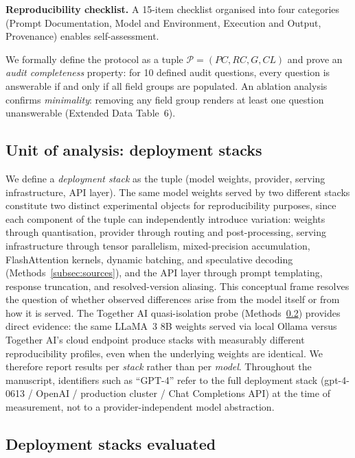 \documentclass[sn-nature]{sn-jnl}
\begin{document}
\textbf{Reproducibility checklist.}
A 15-item checklist organised into four categories (Prompt Documentation, Model and Environment, Execution and Output, Provenance) enables self-assessment.

We formally define the protocol as a tuple $\mathcal{P} = (\mathit{PC}, \mathit{RC}, G, \mathit{CL})$ and prove an \emph{audit completeness} property: for 10 defined audit questions, every question is answerable if and only if all field groups are populated.
An ablation analysis confirms \emph{minimality}: removing any field group renders at least one question unanswerable (Extended Data Table~6).


\subsection{Unit of analysis: deployment stacks}\label{subsec:stacks}

We define a \emph{deployment stack} as the tuple (model weights, provider, serving infrastructure, API layer).
The same model weights served by two different stacks constitute two distinct experimental objects for reproducibility purposes, since each component of the tuple can independently introduce variation: weights through quantisation, provider through routing and post-processing, serving infrastructure through tensor parallelism, mixed-precision accumulation, FlashAttention kernels, dynamic batching, and speculative decoding (Methods~\ref{subsec:sources}), and the API layer through prompt templating, response truncation, and resolved-version aliasing.
This conceptual frame resolves the question of whether observed differences arise from the model itself or from how it is served.
The Together AI quasi-isolation probe (Methods~\ref{subsec:models}) provides direct evidence: the same LLaMA~3 8B weights served via local Ollama versus Together AI's cloud endpoint produce stacks with measurably different reproducibility profiles, even when the underlying weights are identical.
We therefore report results per \emph{stack} rather than per \emph{model}.
Throughout the manuscript, identifiers such as ``GPT-4'' refer to the full deployment stack (gpt-4-0613 / OpenAI / production cluster / Chat Completions API) at the time of measurement, not to a provider-independent model abstraction.


\subsection{Deployment stacks evaluated}\label{subsec:models}
\end{document}
